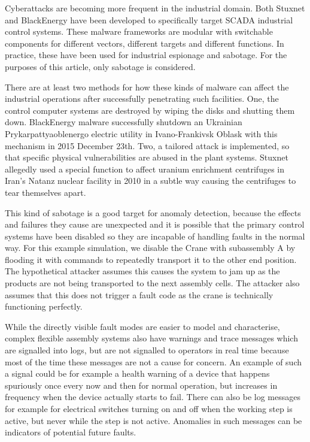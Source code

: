 \documentclass[journal]{IEEEtran}
\begin{document}
Cyberattacks are becoming more frequent in the industrial domain. Both Stuxnet and BlackEnergy have been developed to specifically target SCADA industrial control systems.
These malware frameworks are modular with switchable components for different vectors, different targets and different functions.
In practice, these have been used for industrial espionage and sabotage. For the purposes of this article, only sabotage is considered.

There are at least two methods for how these kinds of malware can affect the industrial operations
after successfully penetrating such facilities. One, the control computer systems are destroyed by wiping the disks and shutting them down. BlackEnergy malware
successfully shutdown an Ukrainian Prykarpattyaoblenergo electric utility in Ivano-Frankivsk Oblask with this mechanism in 2015 December 23th.
Two, a tailored attack is implemented, so that specific physical vulnerabilities are abused in the plant systems. Stuxnet allegedly used a special function
to affect uranium enrichment centrifuges in Iran’s Natanz nuclear facility in 2010 in a subtle way causing the centrifuges to tear themselves apart.

This kind of sabotage is a good target for anomaly detection, because the effects and failures they cause are unexpected and it is possible that the primary control systems
have been disabled so they are incapable of handling faults in the normal way. For this example simulation, we disable the Crane with subassembly A by flooding it with commands
to repeatedly transport it to the other end position. The hypothetical attacker assumes this causes the system to jam up as the products are not being transported to the next
assembly cells. The attacker also assumes that this does not trigger a fault code as the crane is technically functioning perfectly.

While the directly visible fault modes are easier to model and characterise, complex flexible assembly systems also have warnings and trace messages
which are signalled into logs, but are not signalled to operators in real time because most of the time these messages are not a cause for concern.
An example of such a signal could be for example a health warning of a device that happens spuriously once every now and then for normal operation,
but increases in frequency when the device actually starts to fail. There can also be log messages for example for electrical switches turning
on and off when the working step is active, but never while the step is not active. Anomalies in such messages can be indicators of potential
future faults.
\end{document}
